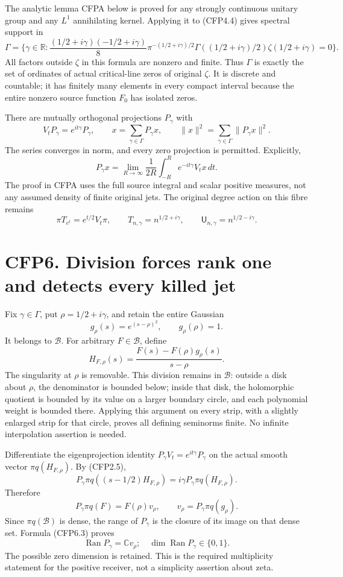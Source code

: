 The analytic lemma CFPA below is proved for any strongly continuous
unitary group and any \(L^1\) annihilating kernel. Applying it to
(CFP4.4) gives spectral support in \[
\Gamma=\{\gamma\in\mathbb R:
\frac{(1/2+i\gamma)(-1/2+i\gamma)}8
\pi^{-(1/2+i\gamma)/2}
\Gamma((1/2+i\gamma)/2)\zeta(1/2+i\gamma)=0\}.
\tag{CFP5.1}
\] All factors outside \(\zeta\) in this formula are nonzero and finite.
Thus \(\Gamma\) is exactly the set of ordinates of actual critical-line
zeros of original \(\zeta\). It is discrete and countable; it has
finitely many elements in every compact interval because the entire
nonzero source function \(F_0\) has isolated zeros.

There are mutually orthogonal projections \(P_\gamma\) with \[
V_tP_\gamma=e^{it\gamma}P_\gamma,
\qquad x=\sum_{\gamma\in\Gamma}P_\gamma x,
\qquad \|x\|^2=\sum_{\gamma\in\Gamma}\|P_\gamma x\|^2.
\tag{CFP5.2}
\] The series converges in norm, and every zero projection is permitted.
Explicitly, \[
P_\gamma x=\lim_{R\to\infty}\frac1{2R}
\int_{-R}^{R}e^{-it\gamma}V_tx\,dt.
\tag{CFP5.3}
\] The proof in CFPA uses the full source integral and scalar positive
measures, not any assumed density of finite original jets. The original
degree action on this fibre remains \[
\pi T_{e^t}=e^{t/2}V_t\pi,
\qquad T_{n,\gamma}=n^{1/2+i\gamma},
\qquad \mathsf U_{n,\gamma}=n^{1/2-i\gamma}.
\tag{CFP5.4}
\]

\section{CFP6. Division forces rank one and detects every killed
jet}\label{cfp6.-division-forces-rank-one-and-detects-every-killed-jet}

Fix \(\gamma\in\Gamma\), put \(\rho=1/2+i\gamma\), and retain the entire
Gaussian \[
g_\rho(s)=e^{(s-\rho)^2},\qquad g_\rho(\rho)=1.
\tag{CFP6.1}
\] It belongs to \(\mathcal B\). For arbitrary \(F\in\mathcal B\),
define \[
H_{F,\rho}(s)=\frac{F(s)-F(\rho)g_\rho(s)}{s-\rho}.
\tag{CFP6.2}
\] The singularity at \(\rho\) is removable. This division remains in
\(\mathcal B\): outside a disk about \(\rho\), the denominator is
bounded below; inside that disk, the holomorphic quotient is bounded by
its value on a larger boundary circle, and each polynomial weight is
bounded there. Applying this argument on every strip, with a slightly
enlarged strip for that circle, proves all defining seminorms finite. No
infinite interpolation assertion is needed.

Differentiate the eigenprojection identity
\(P_\gamma V_t=e^{it\gamma}P_\gamma\) on the actual smooth vector
\(\pi q(H_{F,\rho})\). By (CFP2.5), \[
P_\gamma\pi q((s-1/2)H_{F,\rho})
=i\gamma P_\gamma\pi q(H_{F,\rho}).
\] Therefore \[
\boxed{P_\gamma\pi q(F)
=F(\rho)v_\rho,\qquad
v_\rho=P_\gamma\pi q(g_\rho).}
\tag{CFP6.3}
\] Since \(\pi q(\mathcal B)\) is dense, the range of \(P_\gamma\) is
the closure of its image on that dense set. Formula (CFP6.3) proves \[
\operatorname{Ran}P_\gamma=\mathbb C v_\rho;
\quad\dim\operatorname{Ran}P_\gamma\in\{0,1\}.
\tag{CFP6.4}
\] The possible zero dimension is retained. This is the required
multiplicity statement for the positive receiver, not a simplicity
assertion about zeta.

